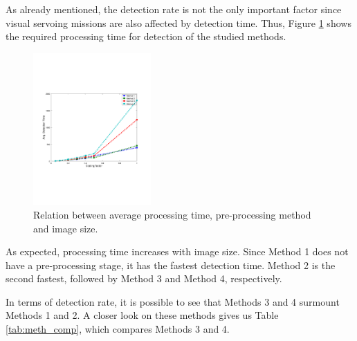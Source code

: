 \documentclass[conference, letterpaper]{IEEEtran}
\begin{document}
As already mentioned, the detection rate is not the only important factor since
visual servoing missions are also affected by detection time. Thus, Figure
\ref{fig:processing_time} shows the required processing time for detection of
the studied methods.

\begin{figure}[!ht]
	\centering
    \includegraphics[width=0.4\textwidth, trim={1.6cm 6.9cm 2.3cm 6.7cm}]{./fig/detection_time_emb.pdf}
    \caption{Relation between average processing time, pre-processing method and image size.}
	\label{fig:processing_time}
\end{figure}

As expected, processing time increases with image size. Since Method 1
does not have a pre-processing stage, it has the fastest detection time. Method
2 is the second fastest, followed by Method 3 and Method 4, respectively. 

In terms of detection rate, it is possible to see that Methods 3 and 4
surmount Methods 1 and 2.  A closer look on these methods gives us Table
\ref{tab:meth_comp}, which compares Methods 3 and 4.
\end{document}
